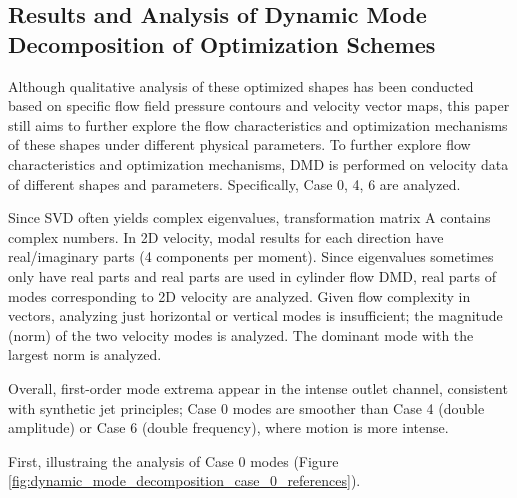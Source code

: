 \documentclass{article}
\begin{document}
\subsection{Results and Analysis of Dynamic Mode Decomposition of Optimization Schemes}\indent

Although qualitative analysis of these optimized shapes has been conducted based on specific flow field pressure contours and velocity vector maps,
this paper still aims to further explore the flow characteristics and optimization mechanisms of these shapes under different physical parameters.
To further explore flow characteristics and optimization mechanisms, DMD is performed on velocity data of different shapes and parameters.
Specifically, Case 0, 4, 6 are analyzed.

Since SVD often yields complex eigenvalues, transformation matrix A contains complex numbers.
In 2D velocity, modal results for each direction have real/imaginary parts (4 components per moment).
Since eigenvalues sometimes only have real parts and real parts are used in cylinder flow DMD, real parts of modes corresponding to 2D velocity are analyzed.
Given flow complexity in vectors, analyzing just horizontal or vertical modes is insufficient; the magnitude (norm) of the two velocity modes is analyzed.
The dominant mode with the largest norm is analyzed.

Overall, first-order mode extrema appear in the intense outlet channel, consistent with synthetic jet principles;
Case 0 modes are smoother than Case 4 (double amplitude) or Case 6 (double frequency), where motion is more intense.

First, illustraing the analysis of Case 0 modes (Figure \ref{fig:dynamic_mode_decomposition_case_0_references}).
\end{document}
